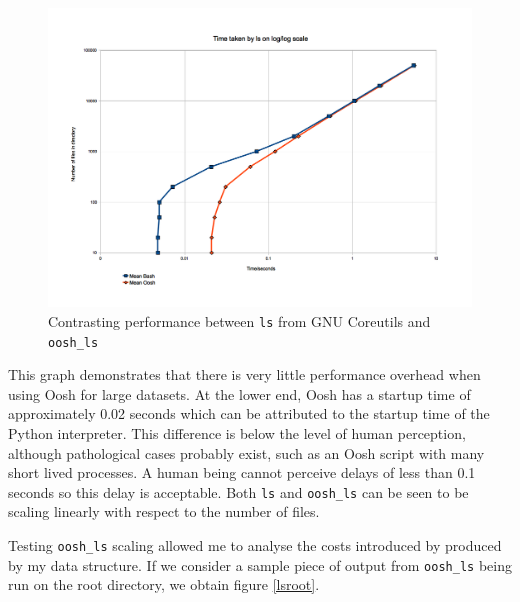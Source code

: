 \documentclass[12pt,twoside,notitlepage]{report}
\begin{document}
\begin{figure}[h]
\centering
\includegraphics[scale=0.5]{ls_graph.png}
\caption{Contrasting performance between {\tt ls} from GNU Coreutils
  and {\tt oosh\_ls}}
\label{lsspeed}
\end{figure}

This graph demonstrates that there is very little performance overhead
when using Oosh for large datasets. At the lower end, Oosh has a
startup time of approximately 0.02 seconds which can be attributed to
the startup time of the Python interpreter. This difference is below
the level of human perception, although pathological cases probably
exist, such as an Oosh script with many short lived processes. A human
being cannot perceive delays of less than 0.1 seconds  \cite{hci}
so this delay is acceptable. Both {\tt ls} and {\tt oosh\_ls} can be
seen to be scaling linearly with respect to the number of files.

Testing {\tt oosh\_ls} scaling allowed me to analyse the costs
introduced by produced by my data structure. If we consider a sample
piece of output from {\tt oosh\_ls} being run on the root directory,
we obtain figure \ref{lsroot}.
\end{document}
